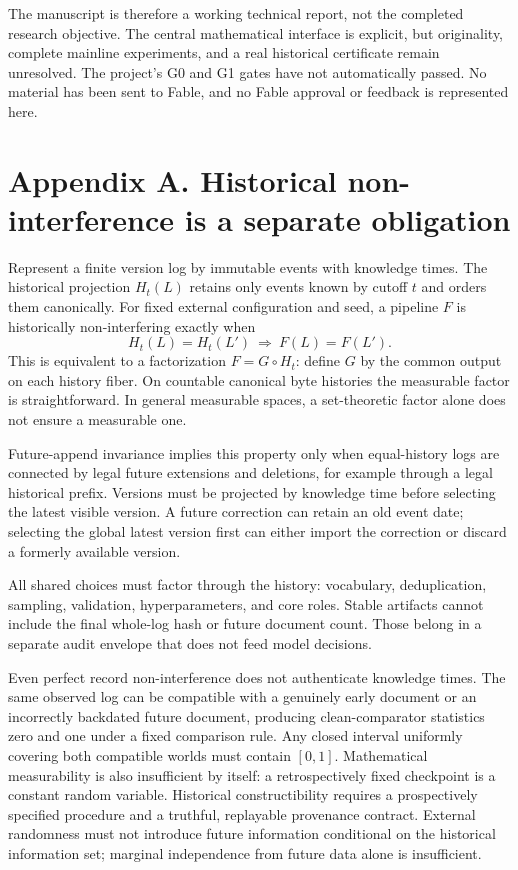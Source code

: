 \documentclass[11pt]{article}
\begin{document}
The manuscript is therefore a working technical report, not the completed research objective. The central mathematical interface is explicit, but originality, complete mainline experiments, and a real historical certificate remain unresolved. The project's G0 and G1 gates have not automatically passed. No material has been sent to Fable, and no Fable approval or feedback is represented here.

\section*{Appendix A. Historical non-interference is a separate obligation}

Represent a finite version log by immutable events with knowledge times. The historical projection $H_t(L)$ retains only events known by cutoff $t$ and orders them canonically. For fixed external configuration and seed, a pipeline $F$ is historically non-interfering exactly when
\[
H_t(L)=H_t(L')\ \Longrightarrow\ F(L)=F(L').
\]
This is equivalent to a factorization $F=G\circ H_t$: define $G$ by the common output on each history fiber. On countable canonical byte histories the measurable factor is straightforward. In general measurable spaces, a set-theoretic factor alone does not ensure a measurable one.

Future-append invariance implies this property only when equal-history logs are connected by legal future extensions and deletions, for example through a legal historical prefix. Versions must be projected by knowledge time before selecting the latest visible version. A future correction can retain an old event date; selecting the global latest version first can either import the correction or discard a formerly available version.

All shared choices must factor through the history: vocabulary, deduplication, sampling, validation, hyperparameters, and core roles. Stable artifacts cannot include the final whole-log hash or future document count. Those belong in a separate audit envelope that does not feed model decisions.

Even perfect record non-interference does not authenticate knowledge times. The same observed log can be compatible with a genuinely early document or an incorrectly backdated future document, producing clean-comparator statistics zero and one under a fixed comparison rule. Any closed interval uniformly covering both compatible worlds must contain $[0,1]$. Mathematical measurability is also insufficient by itself: a retrospectively fixed checkpoint is a constant random variable. Historical constructibility requires a prospectively specified procedure and a truthful, replayable provenance contract. External randomness must not introduce future information conditional on the historical information set; marginal independence from future data alone is insufficient.
\end{document}
